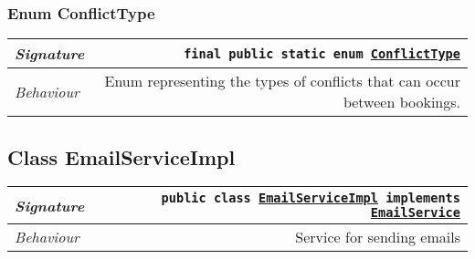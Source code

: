 \begin{adjustwidth}{1.5em}{0pt}
\begin{adjustwidth}{1.5em}{0pt}
\begin{adjustwidth}{1.5em}{0pt}
{\begin{tabularx}{1.0\linewidth}{@{}l R@{}}
      \end{tabularx}}
    \end{adjustwidth}\subsubsection{Enum ConflictType\label{edu.kit.hci.soli.service.impl.BookingsServiceImpl.ConflictType} }
    \begin{adjustwidth}{1.5em}{0pt}
      {\begin{tabularx}{1.0\linewidth}{@{}l R@{}}
        \emph{Signature} & \texttt{final public static  enum \texttt{\hyperref[edu.kit.hci.soli.service.impl.BookingsServiceImpl.ConflictType]{\texttt{ConflictType}}}} \\
        \hline
        \emph{Behaviour} & Enum representing the types of conflicts that can occur between bookings.  \\
        \hline
  
      \end{tabularx}}
    \end{adjustwidth}
  \end{adjustwidth}\subsection{Class EmailServiceImpl\label{edu.kit.hci.soli.service.impl.EmailServiceImpl} }
  \begin{adjustwidth}{1.5em}{0pt}
    {\begin{tabularx}{1.0\linewidth}{@{}l R@{}}
      \emph{Signature} & \texttt{public  class \texttt{\hyperref[edu.kit.hci.soli.service.impl.EmailServiceImpl]{\texttt{EmailServiceImpl}} implements \texttt{\hyperref[edu.kit.hci.soli.service.EmailService]{\texttt{EmailService}}}}} \\
      \hline
      \emph{Behaviour} & Service for sending emails  \\
      \hline
  

\end{tabularx}}
\end{adjustwidth}
\end{adjustwidth}
